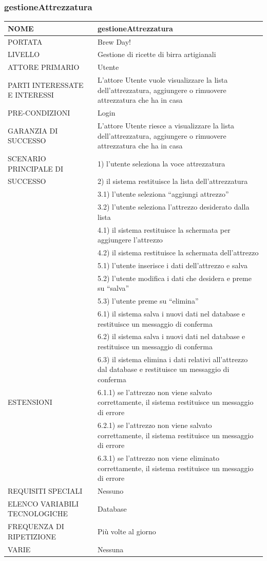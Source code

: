 \documentclass[a4paper, titlepage]{article}
\begin{document}
\subsubsection{gestioneAttrezzatura}
\begin{longtable}{p{6cm}p{7cm}}\toprule
    NOME & gestioneAttrezzatura\\\midrule
    PORTATA & Brew Day!\\\midrule
    LIVELLO & Gestione di ricette di birra artigianali\\\midrule
    ATTORE PRIMARIO & Utente\\\midrule
    PARTI INTERESSATE E INTERESSI &
    L’attore Utente vuole visualizzare la lista dell’attrezzatura, aggiungere o rimuovere attrezzatura che ha in casa \\\midrule
    PRE-CONDIZIONI & Login\\\midrule
    GARANZIA DI SUCCESSO & L’attore Utente riesce a visualizzare la lista dell’attrezzatura, aggiungere o rimuovere
    attrezzatura che ha in casa\\\midrule
    SCENARIO PRINCIPALE DI
    & 1) l’utente seleziona la voce attrezzatura\\
    SUCCESSO & 2) il sistema restituisce la lista dell’attrezzatura\\
    & 3.1) l’utente seleziona “aggiungi attrezzo”\\
    & 3.2) l’utente seleziona l'attrezzo desiderato dalla lista\\
    & 4.1) il sistema restituisce la schermata per aggiungere l'attrezzo\\
    & 4.2) il sistema restituisce la schermata dell'attrezzo\\
    & 5.1) l’utente inserisce i dati dell'attrezzo e salva\\
    & 5.2) l’utente modifica i dati che desidera e preme su “salva”\\
    & 5.3) l’utente preme su “elimina”\\
    & 6.1) il sistema salva i nuovi dati nel database e restituisce un messaggio di conferma\\
    & 6.2) il sistema salva i nuovi dati nel database e restituisce un messaggio di conferma\\
    & 6.3) il sistema elimina i dati relativi all'attrezzo dal database e restituisce un messaggio di conferma\\\midrule
    ESTENSIONI
    & 6.1.1) se l'attrezzo non viene salvato correttamente, il sistema restituisce un messaggio di errore\\
    & 6.2.1) se l'attrezzo non viene salvato correttamente, il sistema restituisce un messaggio di errore\\
    & 6.3.1) se l'attrezzo non viene eliminato correttamente, il sistema restituisce un messaggio di errore \\\midrule
    REQUISITI SPECIALI & Nessuno\\\midrule
    ELENCO VARIABILI TECNOLOGICHE & Database\\\midrule
    FREQUENZA DI RIPETIZIONE & Più volte al giorno\\\midrule
    VARIE & Nessuna\\\bottomrule
\end{longtable}
\vphantom{}
\end{document}
